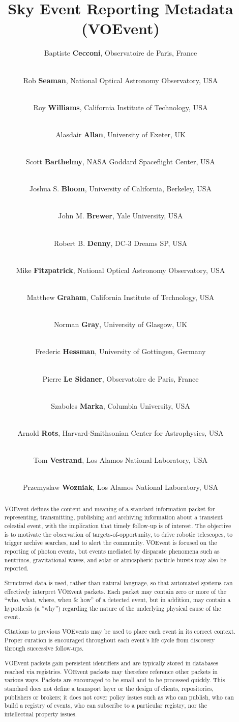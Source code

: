 \documentclass[11pt,a4paper]{ivoa}
\title{Sky Event Reporting Metadata (VOEvent)}
\author{Baptiste {\bf Cecconi}, Observatoire de Paris, France}
\author{\\Rob {\bf Seaman}, National Optical Astronomy Observatory, USA}
\author{\\Roy {\bf Williams}, California Institute of Technology, USA}
\author{\\Alasdair {\bf Allan}, University of Exeter, UK}
\author{\\Scott {\bf Barthelmy}, NASA Goddard Spaceflight Center, USA}
\author{\\Joshua S. {\bf Bloom}, University of California, Berkeley, USA}
\author{\\John M. {\bf Brewer}, Yale University, USA}
\author{\\Robert B. {\bf Denny}, DC-3 Dreams SP, USA}
\author{\\Mike {\bf Fitzpatrick}, National Optical Astronomy Observatory, USA}
\author{\\Matthew {\bf Graham}, California Institute of Technology, USA}
\author{\\Norman {\bf Gray}, University of Glasgow, UK}
\author{\\Frederic {\bf Hessman}, University of Gottingen, Germany}
\author{\\Pierre {\bf Le Sidaner}, Observatoire de Paris, France}
\author{\\Szabolcs {\bf Marka}, Columbia University, USA}
\author{\\Arnold {\bf Rots}, Harvard-Smithsonian Center for Astrophysics, USA}
\author{\\Tom {\bf Vestrand}, Los Alamos National Laboratory, USA}
\author{\\Przemyslaw {\bf Wozniak}, Los Alamos National Laboratory, USA}
\begin{document}
\begin{abstract}
VOEvent \citep{2011ivoa.spec.0711S} defines the content and meaning of a standard information packet for representing, transmitting, publishing and archiving information about a transient celestial event, with the implication that timely follow-up is of interest. The objective is to motivate the observation of targets-of-opportunity, to drive robotic telescopes, to trigger archive searches, and to alert the community. VOEvent is focused on the reporting of photon events, but events mediated by disparate phenomena such as neutrinos, gravitational waves, and solar or atmospheric particle bursts may also be reported.

Structured data is used, rather than natural language, so that automated systems can effectively interpret VOEvent packets. Each packet may contain zero or more of the ``who, what, where, when \& how'' of a detected event, but in addition, may contain a hypothesis (a ``why'') regarding the nature of the underlying physical cause of the event. 

Citations to previous VOEvents may be used to place each event in its correct context. Proper curation is encouraged throughout each event's life cycle from discovery through successive follow-ups. 

VOEvent packets gain persistent identifiers and are typically stored in databases reached via registries. VOEvent packets may therefore reference other packets in various ways. Packets are encouraged to be small and to be processed quickly. This standard does not define a transport layer or the design of clients, repositories, publishers or brokers; it does not cover policy issues such as who can publish, who can build a registry of events, who can subscribe to a particular registry, nor the intellectual property issues.
\end{abstract}


%
%
\end{document}
